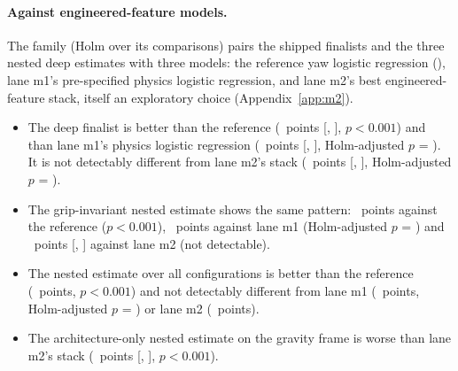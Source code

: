 \paragraph{Against engineered-feature models.}
The family  (Holm over its  comparisons) pairs the shipped finalists and the three nested deep estimates with three models: the reference yaw logistic regression (), lane m1's pre-specified physics logistic regression, and lane m2's best engineered-feature stack, itself an exploratory choice (Appendix~\ref{app:m2}).
\begin{itemize}
  \item The deep finalist is better than the reference (~points [, ], $p < 0.001$) and than lane m1's physics logistic regression (~points [, ], Holm-adjusted $p$ = ). It is not detectably different from lane m2's stack (~points [, ], Holm-adjusted $p$ = ).
  \item The grip-invariant nested estimate shows the same pattern: ~points against the reference ($p < 0.001$), ~points against lane m1 (Holm-adjusted $p$ = ) and ~points [, ] against lane m2 (not detectable).
  \item The nested estimate over all configurations is better than the reference (~points, $p < 0.001$) and not detectably different from lane m1 (~points, Holm-adjusted $p$ = ) or lane m2 (~points).
  \item The architecture-only nested estimate on the gravity frame is worse than lane m2's stack (~points [, ], $p < 0.001$).

\end{itemize}
